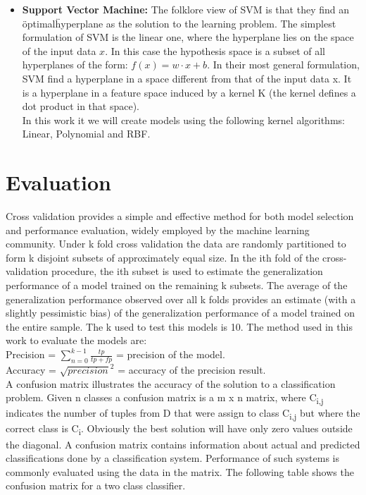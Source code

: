 \begin{itemize}
\item \textbf{Support Vector Machine: }
The folklore view of SVM is that they find an \"optimal\" hyperplane as the solution to the learning problem. The simplest formulation of SVM is the linear one, where the hyperplane lies on the space of the input data $x$. In this case the hypothesis space is a subset of all hyperplanes of the form:
$f(x) = w \cdotp x +b$.
In their most general formulation, SVM find a hyperplane in a space different from that of the input data x. It is a hyperplane in a feature space induced by a kernel K (the kernel defines a dot product in that space)\cite{SVMEvgeniou}.\\
In this work it we will create models using the following kernel algorithms: Linear\cite{SVMTraining}, Polynomial\cite{SVMTraining} and RBF\cite{SVMTraining}.  
\end{itemize}







\section{Evaluation} %
\label{sub:evaluation}
Cross \textendash validation \cite{CrossValidatory} provides a simple and effective method for both model selection and performance evaluation, widely employed by the machine learning community. Under k \textendash fold cross \textendash validation the data are randomly partitioned to form k disjoint subsets of approximately equal size. In the ith fold of the cross-validation procedure, the ith subset is used to estimate the generalization performance of a model trained on the remaining k  subsets. The average of the generalization performance observed over all k folds provides an estimate (with a slightly pessimistic bias) of the generalization performance of a model trained on the entire sample.
The k used to test this models is 10.
The method used in this work to evaluate the models are:\\
Precision = \(\sum_{n=0}^{k-1}\frac{tp}{tp+fp} \)  = precision of the model.\\
Accuracy = \( \sqrt{precision} ^ 2\) = accuracy of the precision result.\\


A confusion matrix \cite{CMPatil} illustrates the accuracy of the solution to a classification problem. Given n classes a confusion matrix is a m x n matrix, where C\textsubscript{i,j} indicates the number of tuples from D that were assign to class C\textsubscript{i,j} but where the correct class is C\textsubscript{i}.
Obviously the best solution will have only zero values outside the diagonal.
A confusion matrix contains information about actual and predicted classifications done by a classification system. Performance of such systems is commonly evaluated using the data in the matrix. The following table shows the confusion matrix for a two class classifier. 

